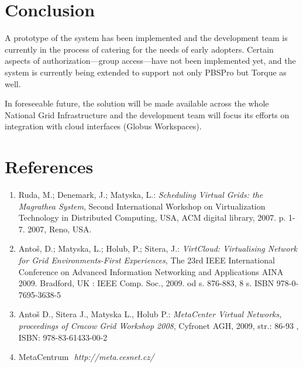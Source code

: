 \documentclass{article}
\begin{document}
\section{Conclusion}

A prototype of the system has been implemented and the development team is currently in the process of catering for the needs of early adopters. Certain aspects of authorization---group access---have not been implemented yet, and the system is currently being extended to support not only PBSPro but Torque as well.

In foreseeable future, the solution will be made available across the whole National Grid Infrastructure and the development team will focus its efforts on integration with cloud interfaces (Globus Workspaces).

\section{References}
\begin{enumerate}
\item Ruda, M.; Denemark, J.; Matyska, L.: \emph{Scheduling Virtual Grids: the Magrathea System},
   Second International Workshop on Virtualization Technology in Distributed Computing, USA,
   ACM digital library, 2007. p. 1-7. 2007, Reno, USA.
\item Anto\v s, D.; Matyska, L.; Holub, P.; Sitera, J.: \emph{VirtCloud: Virtualising Network
   for Grid Environments-First Experiences}, The 23rd IEEE International Conference on Advanced
   Information Networking and Applications AINA 2009. Bradford, UK : IEEE Comp. Soc., 2009. od s.
   876-883, 8 s. ISBN 978-0-7695-3638-5
\item Anto\v s D., Sitera J., Matyska L., Holub P.: \emph{MetaCenter Virtual Networks, proceedings of Cracow
   Grid Workshop 2008}, Cyfronet AGH, 2009, str.: 86-93 , ISBN: 978-83-61433-00-2
\item MetaCentrum ­ \emph{http://meta.cesnet.cz/}
\end{enumerate}
\end{document}
